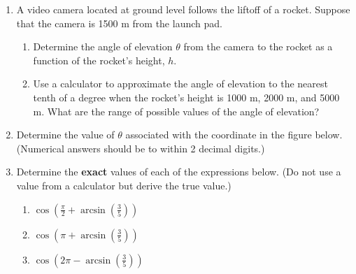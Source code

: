 \begin{enumerate}
  \vfill

\item A video camera located at ground level follows the liftoff of a
  rocket.  Suppose that the camera is 1500 m from the launch pad.
\begin{enumerate}
\item Determine the angle of elevation $\theta$ from the camera to the
  rocket as a function of the rocket's height, $h$.
  
  \vfill
  
\item Use a calculator to approximate the angle of elevation to the
  nearest tenth of a degree when the rocket's height is 1000 m, 2000
  m, and 5000 m. What are the range of possible values of the angle of
  elevation?
  
  \vfill
\end{enumerate}

\clearpage
\item Determine the value of $\theta$ associated with the coordinate
      in the figure below. (Numerical answers should be to within 2
      decimal digits.)


\item Determine the \textbf{exact} values of each of the
  expressions below. (Do not use a value from a calculator but derive the true value.)
  \begin{enumerate}


  \item
    ${\displaystyle \cos\left(\frac{\pi}{2} + \arcsin\left(\frac{3}{5}\right) \right) }$ 
    \vfill
    
   \item
    ${\displaystyle \cos\left(\pi + \arcsin\left(\frac{3}{5}\right) \right) }$ 
    \vfill
    
      \item
    ${\displaystyle \cos\left(2\pi - \arcsin\left(\frac{3}{5}\right) \right) }$ 
    \vfill   
    


  \end{enumerate}

\end{enumerate}

